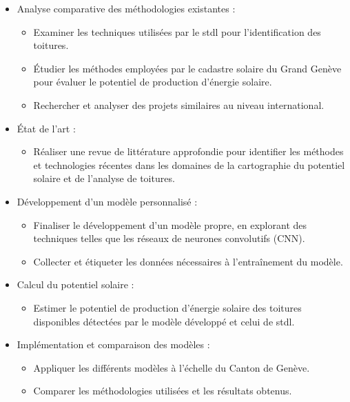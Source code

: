 \begin{itemize}
    \item Analyse comparative des méthodologies existantes :
    \begin{itemize}
        \item Examiner les techniques utilisées par le \acrshort{stdl} pour l'identification des toitures.
        \item Étudier les méthodes employées par le cadastre solaire du Grand Genève pour évaluer le potentiel de production d'énergie solaire.
        \item Rechercher et analyser des projets similaires au niveau international.
    \end{itemize}
    
    \item État de l'art :
    \begin{itemize}
        \item Réaliser une revue de littérature approfondie pour identifier les méthodes et technologies récentes dans les domaines de la cartographie du potentiel solaire et de l'analyse de toitures.
    \end{itemize}
    
    \item Développement d'un modèle personnalisé :
    \begin{itemize}
        \item Finaliser le développement d'un modèle propre, en explorant des techniques telles que les réseaux de neurones convolutifs (CNN).
        \item Collecter et étiqueter les données nécessaires à l'entraînement du modèle.
    \end{itemize}

    \item Calcul du potentiel solaire :
    \begin{itemize}
        \item Estimer le potentiel de production d'énergie solaire des toitures disponibles détectées par le modèle développé et celui de \acrshort{stdl}.
    \end{itemize}

    \item Implémentation et comparaison des modèles :
    \begin{itemize}
        \item Appliquer les différents modèles à l'échelle du Canton de Genève.
        \item Comparer les méthodologies utilisées et les résultats obtenus.
    \end{itemize}


\end{itemize}
